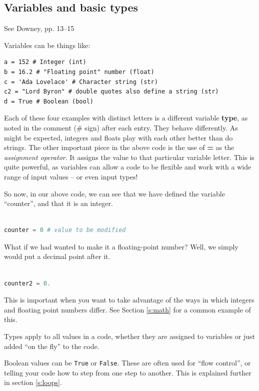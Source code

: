 \documentclass[a4paper,10pt]{scrartcl}
\begin{document}
\subsection{Variables and basic types}

\begin{framed}
See Downey, pp. 13--15
\end{framed}

Variables can be things like:
\begin{lstlisting}
a = 152 # Integer (int)
b = 16.2 # "Floating point" number (float)
c = 'Ada Lovelace' # Character string (str)
c2 = "Lord Byron" # double quotes also define a string (str)
d = True # Boolean (bool)
\end{lstlisting}

Each of these four examples with distinct letters is a different variable \textbf{type}, as noted in the comment (\# sign) after each entry. They behave differently. As might be expected, integers and floats play with each other better than do strings. The other important piece in the above code is the use of \textbf{=} as the \emph{assignment operator}. It assigns the value to that particular variable letter. This is quite powerful, as variables can allow a code to be flexible and work with a wide range of input values -- or even input types!

So now, in our above code, we can see that we have defined the variable ``counter'', and that it is an integer.
\begin{lstlisting}[belowskip=-1.6\baselineskip, language=python]

counter = 0 # value to be modified
\end{lstlisting}

What if we had wanted to make it a floating-point number? Well, we simply would put a decimal point after it.
\begin{lstlisting}[belowskip=-1.6\baselineskip, language=python]

counter2 = 0.
\end{lstlisting}

This is important when you want to take advantage of the ways in which integers and floating point numbers differ. See Section \ref{s:math} for a common example of this.

Types apply to all values in a code, whether they are assigned to variables or just added ``on the fly'' to the code.

Boolean values can be \lstinline{True} or \lstinline{False}. These are often used for ``flow control'', or telling your code how to step from one step to another. This is explained further in section \ref{s:loops}.
\end{document}

